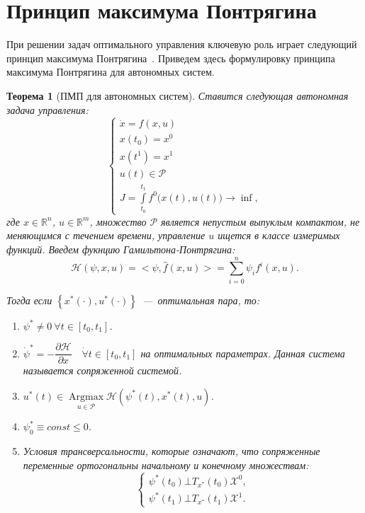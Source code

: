 \documentclass[12pt, a4paper]{article} %
\newtheorem{Th}{Теорема}
\renewcommand{\le}{\leqslant}
\newcommand{\Real}{\mathbb{R}}
\newcommand{\inner}[2]{\bigl< #1, #2 \bigr>}
\DeclareMathOperator*{\Argmax}{Argmax}
\begin{document}
\section{Принцип максимума Понтрягина}

При решении задач оптимального управления ключевую роль играет следующий 
принцип максимума Понтрягина~\cite{Komar}. 
Приведем здесь формулировку принципа максимума Понтрягина для автономных систем.

\begin{Th}[ПМП для автономных систем]\label{th:pmp}
    Ставится следующая автономная задача управления:
    \begin{equation}\label{eq:pmp_eq}
        \begin{cases}
            \dot x = f(x, u) \\
            x(t_0) = x^{0} \\
            x(t^{1}) = x^{1} \\
            u(t) \in \mathcal{P} \\
            J = \displaystyle \int\limits_{t_0}^{t_1} f^0\bigl(x(t), u(t)\bigr) \rightarrow \inf,
        \end{cases} 
    \end{equation} 
где $x \in \Real^n$,  $u \in \Real^m$, множество $\mathcal{P}$ является 
непустым выпуклым компактом, не меняющимся с течением времени,
управление $u$ ищется в классе измеримых функций. 
Введем фукнцию Гамильтона-Понтрягина:
\begin{equation}\label{eq:ham_pontr}
    \mathscr{H}(\psi, x, u) = \inner{\psi}{\hat{f}(x, u)} =
    \sum\limits_{i=0}^{n} \psi_i f^{i} (x, u)
.\end{equation} 

Тогда если $\left\{ x^*(\cdot), u^*(\cdot) \right\}$~---~оптимальная пара, то:
\begin{enumerate}
    \item $\psi^* \neq 0\ \forall t \in [t_0, t_1]$.
    \item $\dot \psi^* = -\dfrac{\partial \mathscr{H}}{\partial x}\quad
        \dot \forall t \in [t_0, t_1]$ на оптимальных параметрах.
        Данная система называется \textit{сопряженной системой}.
    \item $u^*(t) \in \Argmax\limits_{u \in \mathcal{P}} 
        \mathscr{H} (\psi^*(t), x^*(t), u)$.
    \item $\psi^*_0 \equiv const \le 0$.
    \item Условия трансверсальности, которые означают, что сопряженные
        переменные ортогональны начальному и конечному множествам:
    \[
        \begin{cases}
            \psi^*(t_0) \bot T_{x^*}(t_0) \mathcal{X}^0, \\
            \psi^*(t_1) \bot T_{x^*}(t_1) \mathcal{X}^1.
        \end{cases} 
    \] 
\end{enumerate} 
\end{Th} 
\end{document}
